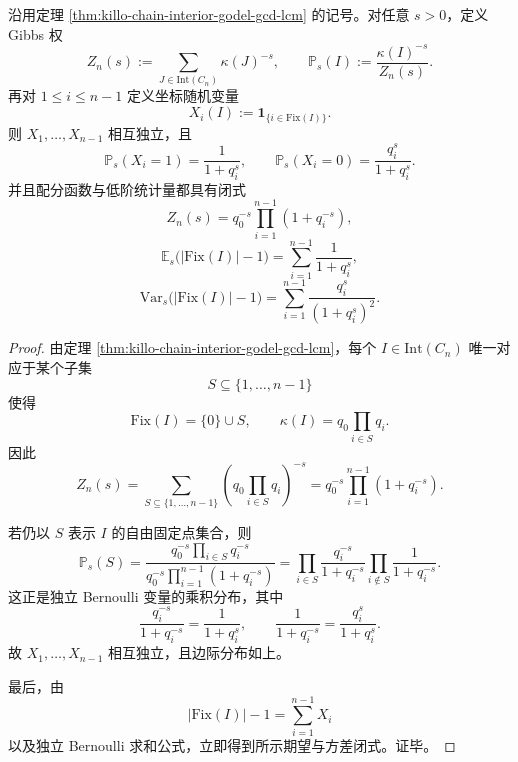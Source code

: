 \begin{theorem}\label{thm:derived-chain-squarefree-gibbs-bernoulli-factorization}
沿用定理 \ref{thm:killo-chain-interior-godel-gcd-lcm} 的记号。对任意 \(s>0\)，定义 Gibbs 权
\[
Z_n(s):=\sum_{J\in \mathrm{Int}(C_n)}\kappa(J)^{-s},
\qquad
\mathbb P_s(I):=\frac{\kappa(I)^{-s}}{Z_n(s)}.
\]
再对 \(1\le i\le n-1\) 定义坐标随机变量
\[
X_i(I):=\mathbf 1_{\{i\in \mathrm{Fix}(I)\}}.
\]
则 \(X_1,\dots,X_{n-1}\) 相互独立，且
\[
\mathbb P_s(X_i=1)=\frac{1}{1+q_i^s},
\qquad
\mathbb P_s(X_i=0)=\frac{q_i^s}{1+q_i^s}.
\]
并且配分函数与低阶统计量都具有闭式
\[
Z_n(s)=q_0^{-s}\prod_{i=1}^{n-1}(1+q_i^{-s}),
\]
\[
\mathbb E_s\bigl(|\mathrm{Fix}(I)|-1\bigr)
=
\sum_{i=1}^{n-1}\frac{1}{1+q_i^s},
\]
\[
\mathrm{Var}_s\bigl(|\mathrm{Fix}(I)|-1\bigr)
=
\sum_{i=1}^{n-1}\frac{q_i^s}{(1+q_i^s)^2}.
\]
\end{theorem}
\begin{proof}
由定理 \ref{thm:killo-chain-interior-godel-gcd-lcm}，每个 \(I\in \mathrm{Int}(C_n)\) 唯一对应于某个子集
\[
S\subseteq \{1,\dots,n-1\}
\]
使得
\[
\mathrm{Fix}(I)=\{0\}\cup S,
\qquad
\kappa(I)=q_0\prod_{i\in S}q_i.
\]
因此
\[
Z_n(s)
=
\sum_{S\subseteq \{1,\dots,n-1\}}
\left(q_0\prod_{i\in S}q_i\right)^{-s}
=
q_0^{-s}\prod_{i=1}^{n-1}(1+q_i^{-s}).
\]

若仍以 \(S\) 表示 \(I\) 的自由固定点集合，则
\[
\mathbb P_s(S)
=
\frac{q_0^{-s}\prod_{i\in S}q_i^{-s}}{q_0^{-s}\prod_{i=1}^{n-1}(1+q_i^{-s})}
=
\prod_{i\in S}\frac{q_i^{-s}}{1+q_i^{-s}}
\prod_{i\notin S}\frac{1}{1+q_i^{-s}}.
\]
这正是独立 Bernoulli 变量的乘积分布，其中
\[
\frac{q_i^{-s}}{1+q_i^{-s}}=\frac{1}{1+q_i^s},
\qquad
\frac{1}{1+q_i^{-s}}=\frac{q_i^s}{1+q_i^s}.
\]
故 \(X_1,\dots,X_{n-1}\) 相互独立，且边际分布如上。

最后，由
\[
|\mathrm{Fix}(I)|-1=\sum_{i=1}^{n-1}X_i
\]
以及独立 Bernoulli 求和公式，立即得到所示期望与方差闭式。证毕。
\end{proof}

